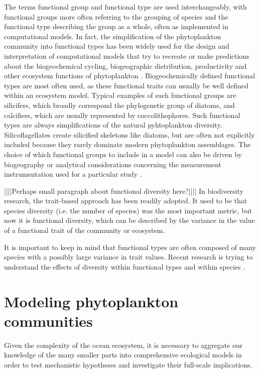 The terms functional group and functional type are used interchangeably, with functional groups more often referring to the grouping of species and the functional type describing the group as a whole, often as implemented in computational models. In fact, the simplification of the phytoplankton community into functional types has been widely used for the design and interpretation of computational models that try to recreate or make predictions about the biogeochemical cycling, biogeographic distribution, productivity and other ecosystem functions of phytoplankton \citep{Gregg2003,LeQuere2005}. Biogeochemically defined functional types are most often used, as these functional traits can usually be well defined within an ecosystem model. Typical examples of such functional groups are silicifers, which broadly correspond the phylogenetic group of diatoms, and calcifiers, which are usually represented by coccolithophores. Such functional types are always simplifications of the natural pyhtoplankton diversity. Silicoflagellates create silicified skeletons like diatoms, but are often not explicitly included because they rarely dominate modern phytoplankton assemblages. The choice of which functional groups to include in a model can also be driven by biogeography or analytical considerations concerning the measurement instrumentation used for a particular study \citep{IrwinAndrewJ.Finkel2017b}. 

||||Perhaps small paragraph about functional diversity here?||||
In biodiversity research, the trait-based approach has been readily adopted. It used to be that species diversity (i.e. the number of species) was the most important metric, but now it is functional diversity, which can be described by the variance in the value of a functional trait of the community or ecosystem.

It is important to keep in mind that functional types are often composed of many species with a possibly large variance in trait values. Recent research is trying to understand the effects of diversity within functional types and within species \citep{Violle2012,Violle2017a,DesRoches2018}.




\section{Modeling phytoplankton communities}
Given the complexity of the ocean ecosystem, it is necessary to aggregate our knowledge of the many smaller parts into comprehensive ecological models in order to test mechanistic hypotheses and investigate their full-scale implications. 


